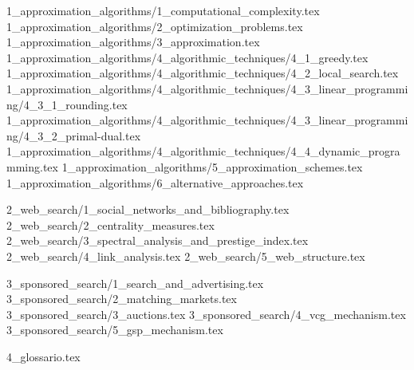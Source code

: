 \documentclass{article}
\begin{document}
	\begin{flushleft}
		\tableofcontents
	\end{flushleft}

	\newpage

	\begin{flushleft}
		{1_approximation_algorithms/1_computational_complexity.tex}
		{1_approximation_algorithms/2_optimization_problems.tex}
		{1_approximation_algorithms/3_approximation.tex}
		{1_approximation_algorithms/4_algorithmic_techniques/4_1_greedy.tex}
		{1_approximation_algorithms/4_algorithmic_techniques/4_2_local_search.tex}
		{1_approximation_algorithms/4_algorithmic_techniques/4_3_linear_programming/4_3_1_rounding.tex}
		{1_approximation_algorithms/4_algorithmic_techniques/4_3_linear_programming/4_3_2_primal-dual.tex}
		{1_approximation_algorithms/4_algorithmic_techniques/4_4_dynamic_programming.tex}
		{1_approximation_algorithms/5_approximation_schemes.tex}
		{1_approximation_algorithms/6_alternative_approaches.tex}
	\end{flushleft}

	\begin{flushleft}
		{2_web_search/1_social_networks_and_bibliography.tex}
		{2_web_search/2_centrality_measures.tex}
		{2_web_search/3_spectral_analysis_and_prestige_index.tex}
		{2_web_search/4_link_analysis.tex}
		{2_web_search/5_web_structure.tex}
	\end{flushleft}

	\begin{flushleft}
		{3_sponsored_search/1_search_and_advertising.tex}
		{3_sponsored_search/2_matching_markets.tex}
		{3_sponsored_search/3_auctions.tex}
		{3_sponsored_search/4_vcg_mechanism.tex}
		{3_sponsored_search/5_gsp_mechanism.tex}
	\end{flushleft}

	\newpage

	\begin{flushleft}
		{4_glossario.tex}
	\end{flushleft}
\end{document}
